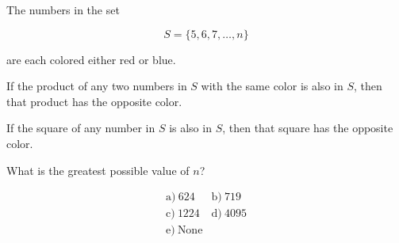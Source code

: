 The numbers in the set



\[
S=\{5,6,7,\ldots,n\}
\]

are each colored either red or blue.



If the product of any two numbers in \(S\) with the same color is also in \(S\), then that product has the opposite color.



If the square of any number in \(S\) is also in \(S\), then that square has the opposite color.



What is the greatest possible value of \(n\)?



\[
\begin{array}{ll}
\text{a)}\ 624 & \text{b)}\ 719 \\
\text{c)}\ 1224 & \text{d)}\ 4095 \\
\text{e)}\ \text{None}
\end{array}
\]
